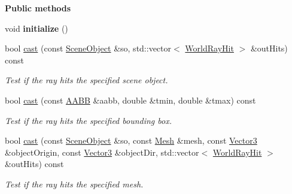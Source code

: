 \begin{Indent}\textbf{ Public methods}\par
\begin{DoxyCompactItemize}
\item 
\mbox{\label{classrev_1_1_world_ray_a0ed92f8d22856e66a18a6d803a6eba7c}} 
void {\bfseries initialize} ()
\item 
\mbox{\label{classrev_1_1_world_ray_a9149ee734f687282551f6466e9a6ed00}} 
bool \mbox{\hyperlink{classrev_1_1_world_ray_a9149ee734f687282551f6466e9a6ed00}{cast}} (const \mbox{\hyperlink{classrev_1_1_scene_object}{Scene\+Object}} \&so, std\+::vector$<$ \mbox{\hyperlink{structrev_1_1_world_ray_hit}{World\+Ray\+Hit}} $>$ \&out\+Hits) const
\begin{DoxyCompactList}\small\item\em Test if the ray hits the specified scene object. \end{DoxyCompactList}\item 
bool \mbox{\hyperlink{classrev_1_1_world_ray_a53604bdab9b5945098cc81a3cc84cc1d}{cast}} (const \mbox{\hyperlink{classrev_1_1_a_a_b_b}{A\+A\+BB}} \&aabb, double \&tmin, double \&tmax) const
\begin{DoxyCompactList}\small\item\em Test if the ray hits the specified bounding box. \end{DoxyCompactList}\item 
bool \mbox{\hyperlink{classrev_1_1_world_ray_a24c77ebf8143de984134f5424228b134}{cast}} (const \mbox{\hyperlink{classrev_1_1_scene_object}{Scene\+Object}} \&so, const \mbox{\hyperlink{classrev_1_1_mesh}{Mesh}} \&mesh, const \mbox{\hyperlink{classrev_1_1_vector}{Vector3}} \&object\+Origin, const \mbox{\hyperlink{classrev_1_1_vector}{Vector3}} \&object\+Dir, std\+::vector$<$ \mbox{\hyperlink{structrev_1_1_world_ray_hit}{World\+Ray\+Hit}} $>$ \&out\+Hits) const
\begin{DoxyCompactList}\small\item\em Test if the ray hits the specified mesh. \end{DoxyCompactList}\end{DoxyCompactItemize}
\end{Indent}
